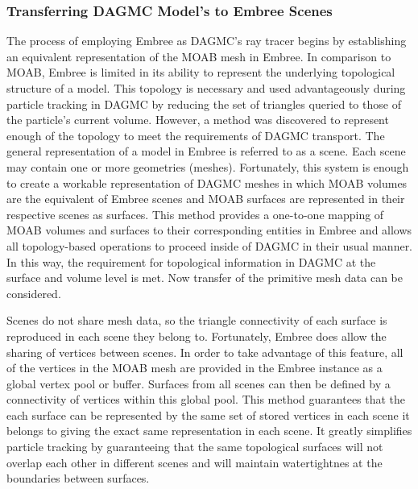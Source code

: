 \documentclass[12pt, a4paper]{article}
\begin{document}
\subsubsection{Transferring DAGMC Model's to Embree Scenes}%

The process of employing Embree as DAGMC's ray tracer begins by establishing an equivalent representation of the MOAB mesh in Embree. In comparison to MOAB, Embree is limited in its ability to represent the underlying topological structure of a model. This topology is necessary and used advantageously during particle tracking in DAGMC by reducing the set of triangles queried to those of the particle's current volume. However, a method was discovered to represent enough of the topology to meet the requirements of DAGMC transport. The general representation of a model in Embree is referred to as a scene. Each scene may contain one or more geometries (meshes). Fortunately, this system is enough to create a workable representation of DAGMC meshes in which MOAB volumes are the equivalent of Embree scenes and MOAB surfaces are represented in their respective scenes as surfaces. This method provides a one-to-one mapping of MOAB volumes and surfaces to their corresponding entities in Embree and allows all topology-based operations to proceed inside of DAGMC in their usual manner. In this way, the requirement for topological information in DAGMC at the surface and volume level is met. Now transfer of the primitive mesh data can be considered.

Scenes do not share mesh data, so the triangle connectivity of each surface is reproduced in each scene they belong to. Fortunately, Embree does allow the sharing of vertices between scenes. In order to take advantage of this feature, all of the vertices in the MOAB mesh are provided in the Embree instance as a global vertex pool or buffer. Surfaces from all scenes can then be defined by a connectivity of vertices within this global pool. This method guarantees that the each surface can be represented by the same set of stored vertices in each scene it belongs to giving the exact same representation in each scene. It greatly simplifies particle tracking by guaranteeing that the same topological surfaces will not overlap each other in different scenes and will maintain watertightnes at the boundaries between surfaces.
\end{document}
